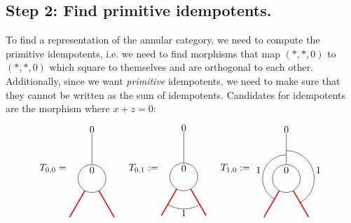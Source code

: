 \subsection*{Step 2: Find primitive idempotents.} To find a representation of the annular category, we need to compute the primitive idempotents, i.e. we need to find morphisms that map $(*,*,0)$ to $(*,*,0)$ which square to themselves and are orthogonal to each other. Additionally, since we want \emph{primitive} idempotents, we need to make sure that they cannot be written as the sum of idempotents.
Candidates for idempotents are the morphism where $x+z=0$:
	\begin{equation}
		T_{0,0}=
		\begin{tikzpicture}[scale=1,baseline=(current bounding box.center)]
			\draw (0,0) circle (0.5cm);
			\draw[red,line width=0.4mm]
			\foreach \a in {-60, -120} {
				(\a:0.5) -- (\a:1.6)
			};
			\draw[] (90:0.5) -- (90:1.6);
			\node at (90:.3cm){$0$};\node at (90:1.75cm){$0$};
		\end{tikzpicture}
		\hspace{5mm}
		T_{0,1}:=
		\begin{tikzpicture}[scale=1,baseline=(current bounding box.center)]
		\draw (0,0) circle (0.5cm);
		\draw[red,line width=0.4mm]
		\foreach \a in {-60, -120} {
			(\a:0.5) -- (\a:1.6)
		};
		\draw ([shift=(-120:1.15cm)]0,0) arc (-120:-60:1.15cm);
		\draw[] (90:0.5) -- (90:1.6);
		\node at (90:.3cm){$0$};\node at (90:1.75cm){$0$};
		\node at (0,-1.3) {$1$};
		\end{tikzpicture}
		\hspace{5mm}
		T_{1,0}:=
		\begin{tikzpicture}[scale=1,baseline=(current bounding box.center)]
		\draw (0,0) circle (0.5cm);
		\draw[red,line width=0.4mm]
		\foreach \a in {-60, -120} {
			(\a:0.5) -- (\a:1.6)
		};
		\draw ([shift=(-60:1cm)]0,0) arc (-60:90:1cm);
		\draw ([shift=(240:0.85cm)]0,0) arc (240:90:0.85cm);
		\draw[] (90:0.5) -- (90:1.6);
		\node at (90:.3cm){$0$};\node at (90:1.75cm){$0$};
		\node at (-1,0.3) {$1$};
		\node at (1.15,0.3) {$1$};

\end{tikzpicture}
\end{equation}
